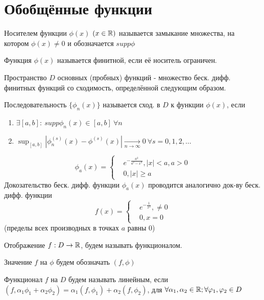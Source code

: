 \documentclass{article}
\begin{document}
\section{Обобщённые функции}
\begin{definition}
  Носителем функции $\phi(x)$ $(x\in \mathbb{R})$ называется замыкание множества,
  на котором $\phi(x) \neq 0$ и обозначается $supp \phi$
\end{definition}
\begin{definition}
  Функция $\phi(x)$ называется финитной, если её носитель ограничен.
\end{definition}
\begin{definition}
  Пространство $D$ основных (пробных) функций - множество беск. дифф. финитных функций
  со сходимость, определённой следующим образом.
\end{definition}
\begin{definition}
  Последовательность $\{\phi_n(x)\}$ называется сход. в $D$ к функции $\phi(x)$, если 
  \begin{enumerate}
    \item $\exists [a,b]: \ supp \phi_n(x) \in [a,b] \ \forall n$
    \item $\sup_{[a,b]}|\phi_n^{(s)}(x)-\phi^{(s)}(x)| \underset{n\to \infty}{\to} 0 \ \forall s =0,1,2,\dots $
  \end{enumerate}
\end{definition}
\begin{eg}
  \[
    \phi_a(x)=\left\{\begin{aligned}
      &e^{-\frac{a^{2}}{a^{2}-x^{2}}}, |x|<a, a>0 \\ 
      &0, |x|\ge a
    \end{aligned}\right.
  \]
  Докозательство беск. дифф. функции $\phi_a(x)$ проводится аналогично док-ву беск. дифф. функции
  \[
    f(x) = \left\{\begin{aligned}
      & e^{-\frac{1}{x^{2}}}, \neq 0 \\ 
      & 0, x=0
    \end{aligned}\right.
  \]
  (пределы всех производных в точках $a$ равны $0$)
\end{eg}
\begin{definition}
  Отображение $f: D \to \mathbb{R}$, будем называть функционалом.

  Значение $f$ на $\phi$ будем обозначать $(f,\phi)$
\end{definition}
\begin{definition}
  Функционал $f$ на $D$ будем называть линейным, если $(f,\alpha_1\phi_1+\alpha_2\phi_2)=\alpha_1(f,\phi_1)+\alpha_2(f,\phi_2)$,
  для $\forall \alpha_1,\alpha_2 \in \mathbb{R}; \forall \varphi_1,\varphi_2 \in D$
\end{definition}
\end{document}
